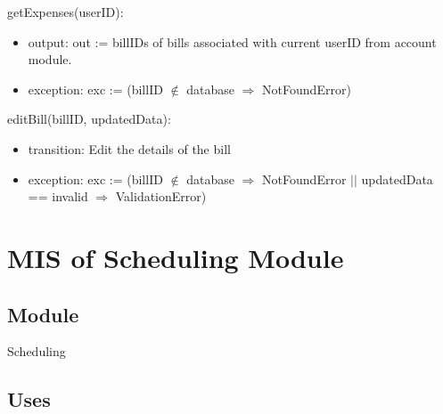 \documentclass[12pt, titlepage]{article}
\begin{document}
\noindent getExpenses(userID):
\begin{itemize}
\item output: out := billIDs of bills associated with current userID from account module.
\item exception: exc := (billID $\notin$ database $\Rightarrow$ NotFoundError)
\end{itemize}

\noindent editBill(billID, updatedData):
\begin{itemize}
\item transition: Edit the details of the bill
\item exception: exc := (billID $\notin$ database $\Rightarrow$ NotFoundError $\vert$$\vert$ updatedData == invalid $\Rightarrow$ ValidationError)
\end{itemize}





\section{MIS of Scheduling Module} \label{mB} 



\subsection{Module}

Scheduling


\subsection{Uses}
\end{document}
